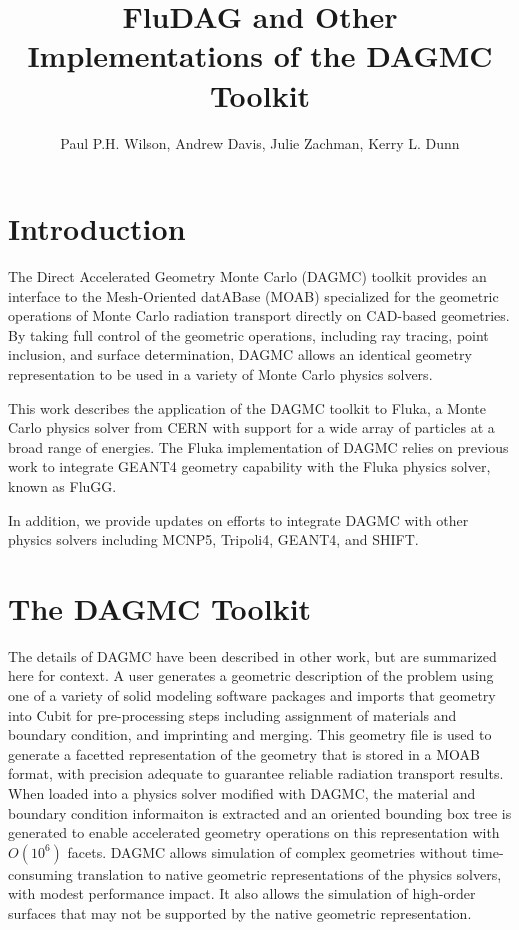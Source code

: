 \documentclass{anstrans}
\title{FluDAG and Other Implementations of the DAGMC Toolkit}
\author{Paul P.H. Wilson, Andrew Davis, Julie Zachman, Kerry L. Dunn}
\institute{University of Wisconsin-Madison, 1500 Engineering Dr, Madison, WI 53706}
\begin{document}
\section{Introduction}

The Direct Accelerated Geometry Monte Carlo (DAGMC) toolkit provides
an interface to the Mesh-Oriented datABase (MOAB) specialized for the
geometric operations of Monte Carlo radiation transport directly on
CAD-based geometries.  By taking full control of the geometric
operations, including ray tracing, point inclusion, and surface
determination, DAGMC allows an identical geometry representation to be
used in a variety of Monte Carlo physics solvers.

This work describes the application of the DAGMC toolkit to
Fluka\cite{fluka}, a Monte Carlo physics solver from CERN with support
for a wide array of particles at a broad range of energies.  The Fluka
implementation of DAGMC relies on previous work to integrate
GEANT4\cite{GEANT4} geometry capability with the Fluka physics solver,
known as FluGG\cite{flugg}.

In addition, we provide updates on efforts to integrate DAGMC with
other physics solvers including MCNP5\cite{mcnp5},
Tripoli4\cite{tripolo}, GEANT4, and SHIFT\cite{shift}.

\section{The DAGMC Toolkit}

The details of DAGMC have been described in other work, but are
summarized here for context.  A user generates a geometric description
of the problem using one of a variety of solid modeling software
packages and imports that geometry into Cubit\cite{cubit} for
pre-processing steps including assignment of materials and boundary
condition, and imprinting and merging.  This geometry file is used to
generate a facetted representation of the geometry that is stored in a
MOAB format, with precision adequate to guarantee reliable radiation
transport results\cite{snouffer}.  When loaded into a physics solver
modified with DAGMC, the material and boundary condition informaiton
is extracted and an oriented bounding box tree is generated to enable
accelerated geometry operations on this representation with $O(10^6)$
facets.  DAGMC allows simulation of complex geometries without
time-consuming translation to native geometric representations of the
physics solvers, with modest performance impact.  It also allows the
simulation of high-order surfaces that may not be supported by the
native geometric representation.
\end{document}

